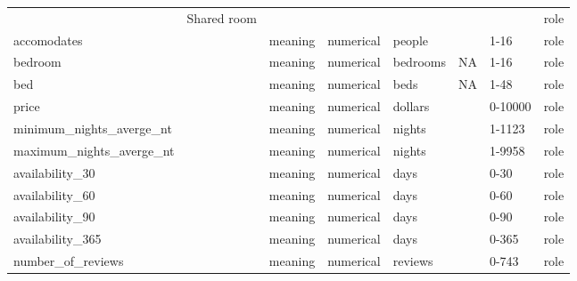 \begin{center}
\begin{longtable}{@{}llllllll@{}}
                            & Shared room                 &                                   &             &                &                             &                     & role \\
accomodates                 &                             & meaning                           & numerical   & people         &                             &                     1-16    & role \\
bedroom                     &                             & meaning                           & numerical   & bedrooms       & NA                          &                     1-16    & role \\
bed                         &                             & meaning                           & numerical   & beds           & NA                          &                     1-48    & role \\
price                       &                             & meaning                           & numerical   & dollars        &                             &                     0-10000 & role \\
minimum\_nights\_averge\_nt &                             & meaning                           & numerical   & nights         &                             &                     1-1123  & role \\
maximum\_nights\_averge\_nt &                             & meaning                           & numerical   & nights         &                             &                     1-9958  & role \\
availability\_30            &                             & meaning                           & numerical   & days           &                             &                     0-30    & role \\
availability\_60            &                             & meaning                           & numerical   & days           &                             &                     0-60    & role \\
availability\_90            &                             & meaning                           & numerical   & days           &                             &                     0-90    & role \\
availability\_365           &                             & meaning                           & numerical   & days           &                             &                     0-365   & role \\
number\_of\_reviews         &                             & meaning                           & numerical   & reviews        &                             &                     0-743   & role \\

\end{longtable}
\end{center}
